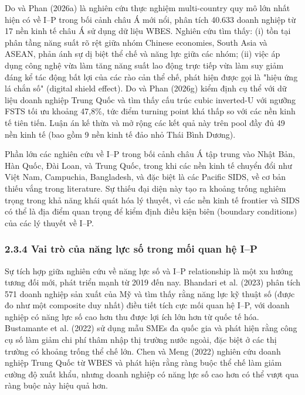 \documentclass[12pt,a4paper]{article}
\begin{document}
Do và Phan (2026a) là nghiên cứu thực nghiệm multi-country quy mô lớn
nhất hiện có về I--P trong bối cảnh châu Á mới nổi, phân tích 40.633
doanh nghiệp từ 17 nền kinh tế châu Á sử dụng dữ liệu WBES. Nghiên cứu
tìm thấy: (i) tồn tại phân tầng năng suất rõ rệt giữa nhóm Chinese
economies, South Asia và ASEAN, phản ánh sự dị biệt thể chế và năng lực
giữa các nhóm; (ii) việc áp dụng công nghệ vừa làm tăng năng suất lao
động trực tiếp vừa làm suy giảm đáng kể tác động bất lợi của các rào cản
thể chế, phát hiện được gọi là "hiệu ứng lá chắn số" (digital shield
effect). Do và Phan (2026g) kiểm định cụ thể với dữ liệu doanh nghiệp
Trung Quốc và tìm thấy cấu trúc cubic inverted-U với ngưỡng FSTS tối ưu
khoảng 47,8\%, tức điểm turning point khá thấp so với các nền kinh tế
tiên tiến. Luận án kế thừa và mở rộng các kết quả này trên pool đầy đủ
49 nền kinh tế (bao gồm 9 nền kinh tế đảo nhỏ Thái Bình Dương).

Phần lớn các nghiên cứu về I--P trong bối cảnh châu Á tập trung vào Nhật
Bản, Hàn Quốc, Đài Loan, và Trung Quốc, trong khi các nền kinh tế chuyển
đổi như Việt Nam, Campuchia, Bangladesh, và đặc biệt là các Pacific
SIDS, về cơ bản thiếu vắng trong literature. Sự thiếu đại diện này tạo
ra khoảng trống nghiêm trọng trong khả năng khái quát hóa lý thuyết, vì
các nền kinh tế frontier và SIDS có thể là địa điểm quan trọng để kiểm
định điều kiện biên (boundary conditions) của các lý thuyết về I--P.

\hypertarget{234-vai-truxf2-cux1ee7a-nux103ng-lux1ef1c-sux1ed1-trong-mux1ed1i-quan-hux1ec7-ip}{%
\subsubsection{2.3.4 Vai trò của năng lực số trong mối quan hệ
I--P}\label{234-vai-truxf2-cux1ee7a-nux103ng-lux1ef1c-sux1ed1-trong-mux1ed1i-quan-hux1ec7-ip}}

Sự tích hợp giữa nghiên cứu về năng lực số và I--P relationship là một
xu hướng tương đối mới, phát triển mạnh từ 2019 đến nay. Bhandari et al.
(2023) phân tích 571 doanh nghiệp sản xuất của Mỹ và tìm thấy rằng năng
lực kỹ thuật số (được đo như một composite duy nhất) điều tiết tích cực
mối quan hệ I--P, với doanh nghiệp có năng lực số cao hơn thu được lợi
ích lớn hơn từ quốc tế hóa. Bustamante et al. (2022) sử dụng mẫu SMEs đa
quốc gia và phát hiện rằng công cụ số làm giảm chi phí thâm nhập thị
trường nước ngoài, đặc biệt ở các thị trường có khoảng trống thể chế
lớn. Chen và Meng (2022) nghiên cứu doanh nghiệp Trung Quốc từ WBES và
phát hiện rằng ràng buộc thể chế làm giảm cường độ xuất khẩu, nhưng
doanh nghiệp có năng lực số cao hơn có thể vượt qua ràng buộc này hiệu
quả hơn.
\end{document}
